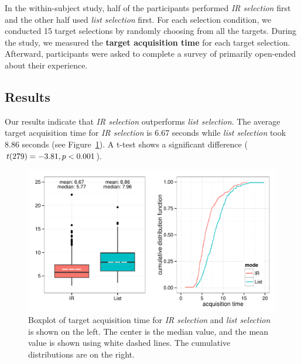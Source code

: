 In the within-subject study, half of the participants performed {\em IR selection} first and the other half used {\em list selection} first. For each selection condition, we conducted 15 target selections by randomly choosing from all the targets. During the study, we measured the {\bf target acquisition time} for each target selection. Afterward, participants were asked to complete a survey of primarily open-ended  about their experience.


\subsection{Results}
Our results indicate that {\em IR selection} outperforms {\em list selection}.  The average target acquisition time for {\em IR selection} is 6.67 seconds 
while {\em list selection} took 8.86 seconds (see Figure~\ref{fig:ir_vs_list}). A t-test shows a significant difference ($t(279)=-3.81, {p < 0.001}$).

\begin{figure}[t]
\centering
\includegraphics[width=0.95\columnwidth]{figures/result_study1a.pdf}
\caption{Boxplot of target acquisition time for {\em IR selection} and {\em list selection} is shown on the left. The center is the median value, and the mean value is shown using white dashed lines. The cumulative distributions are on the right.}
\label{fig:ir_vs_list}
\end{figure}

